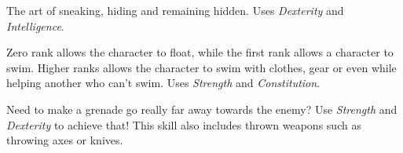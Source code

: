 \begin{description}
   The art of sneaking, hiding and remaining hidden. Uses
  \emph{Dexterity} and \emph{Intelligence}.

   Zero rank allows the character to float, while the first rank
  allows a character to swim. Higher ranks allows the character to swim with
  clothes, gear or even while helping another who can't swim. Uses \emph{Strength}
  and \emph{Constitution}.

   Need to make a grenade go really far away towards the enemy?
  Use \emph{Strength} and \emph{Dexterity} to achieve that! This skill also
  includes thrown weapons such as throwing axes or knives.
\end{description}
